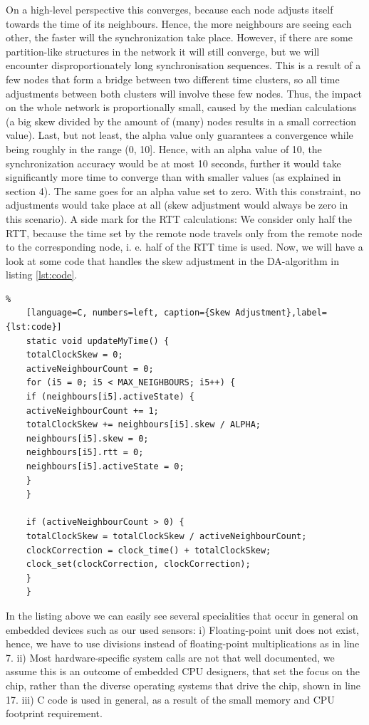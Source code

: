\documentclass{llncs}
\begin{document}
	\noindent On a high-level perspective this converges, because each node adjusts itself towards the time of its neighbours. Hence, the more neighbours are seeing each other, the faster will the synchronization take place. However, if there are some partition-like structures in the network it will still converge, but we will encounter disproportionately long synchronisation sequences. This is a result of a few nodes that form a bridge between two different time clusters, so all time adjustments between both clusters will involve these few nodes. Thus, the impact on the whole network is proportionally small, caused by the median calculations (a big skew divided by the amount of (many) nodes results in a small correction value). Last, but not least, the alpha value only guarantees a convergence while being roughly in the range (0, 10]. Hence, with an alpha value of 10, the synchronization accuracy would be at most 10 seconds, further it would take significantly more time to converge than with smaller values (as explained in section 4). The same goes for an alpha value set to zero. With this constraint, no adjustments would take place at all (skew adjustment would always be zero in this scenario).
	\bigbreak
	\noindent A side mark for the RTT calculations: We consider only half the RTT, because the time set by the remote node travels only from the remote node to the corresponding node, i. e. half of the RTT time is used.
	\bigbreak
	\noindent
	Now, we will have a look at some code that handles the skew adjustment in the DA-algorithm in listing \ref{lst:code}.
	
	\begin{lstlisting}%
	[language=C, numbers=left, caption={Skew Adjustment},label={lst:code}]
	static void updateMyTime() {
	totalClockSkew = 0;
	activeNeighbourCount = 0;
	for (i5 = 0; i5 < MAX_NEIGHBOURS; i5++) {
	if (neighbours[i5].activeState) {
	activeNeighbourCount += 1;
	totalClockSkew += neighbours[i5].skew / ALPHA;
	neighbours[i5].skew = 0;
	neighbours[i5].rtt = 0;
	neighbours[i5].activeState = 0;
	}
	}
	
	if (activeNeighbourCount > 0) {
	totalClockSkew = totalClockSkew / activeNeighbourCount;
	clockCorrection = clock_time() + totalClockSkew;
	clock_set(clockCorrection, clockCorrection);
	}
	}
	\end{lstlisting}
	\noindent In the listing above we can easily see several specialities that occur in general on embedded devices such as our used sensors: i) Floating-point unit does not exist, hence, we have to use divisions instead of floating-point multiplications as in line 7. ii) Most hardware-specific system calls are not that well documented, we assume this is an outcome of embedded CPU designers, that set the focus on the chip, rather than the diverse operating systems that drive the chip, shown in line 17. iii) C code is used in general, as a result of the small memory and CPU footprint requirement.
	
\end{document}
